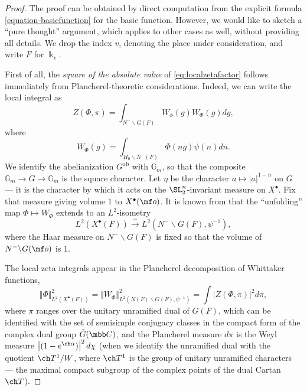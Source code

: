 \documentclass[final]{amsart}
\theoremstyle{remark}
\theoremstyle{definition}
\numberwithin{equation}{section}
\begin{document}
\begin{proof}
The proof can be obtained by direct computation from the explicit formula \eqref{equation-basicfunction} for the basic function. However, we would like to sketch a ``pure thought'' argument, which applies to other cases as well, without providing all details. 
We drop the index $v$, denoting the place under consideration, and write $F$ for $\Bbbk_v$.

First of all, the \emph{square of the absolute value} of \eqref{eq:localzetafactor} follows immediately from Plancherel-theoretic considerations. Indeed, we can write the local integral as 
 \[    Z(\Phi, \pi)=  \int_{N^-\backslash G (F)} W_{\phi}(g) W_{\Phi}(g)  dg,\]
 where 
 \begin{equation}\label{unfolding} W_{\Phi}(g) = \int_{H_0\backslash N^-(F)} \Phi(ng)\psi(n) dn.
 \end{equation}
 We identify the abelianization $G^{\text{ab}}$ with $\mathbb G_m$, so that the composite $\mathbb G_m\to G\to\mathbb G_m$ is the square character. 
 Let $\eta$ be the character $a\mapsto |a|^{1-n}$ on $G$ --- it is the character by which it acts on the $\SL_2^n$-invariant measure on $X^\bullet$. Fix that measure giving volume $1$ to $X^\bullet(\mf o)$.
 It is known from \cite[Theorem 9.5.9]{SV} that the ``unfolding'' map $\Phi \mapsto W_{\Phi}$ extends to an $L^2$-isometry
 \[ L^2(X^\bullet(F)) \xrightarrow\sim L^2(N^-\backslash G(F), \psi^{-1}),\]
 where the Haar measure on $N^-\backslash G(F)$ is fixed so that the volume of $N^-\backslash G(\mf o)$ is $1$.
 
 The local zeta integrals appear in the Plancherel decomposition of Whittaker functions,  \begin{equation}\label{eq:PlancherelWhittaker} \Vert \Phi\Vert^2_{L^2(X^\bullet(F))} = \Vert W_{\Phi}\Vert^2_{L^2(N(F)\backslash G(F), \psi^{-1})} = \int |Z(\Phi, \pi)|^2 d\pi, 
 \end{equation}
  where $\pi$ ranges over the unitary unramified dual of $G(F)$, which can be identified with the set of semisimple conjugacy classes in the compact form of the complex dual group $\check G(\mbb C)$, and the Plancherel measure $d\pi$ is the Weyl measure $\left|(1-e^{\ch\alpha})\right|^2 d\chi$ (when we identify the unramified dual with the quotient $\ch T^1/W$, where $\ch T^1$ is the group of unitary unramified characters --- the maximal compact subgroup of the complex points of the dual Cartan $\ch T$).
 

\end{proof}
\end{document}
